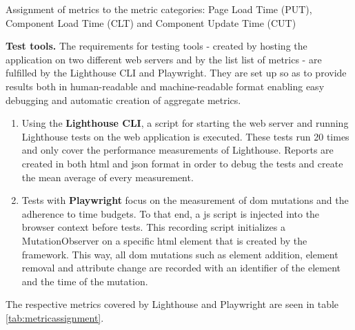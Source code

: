 \documentclass[a4paper, 12pt]{article}
\begin{document}
\begin{table}[h]
\begin{center}
  \end{center}
  \caption{Assignment of metrics to the metric categories: Page Load Time (PUT), Component Load Time (CLT) and Component Update Time (CUT)}
  \label{tab:metriccategories}
\end{table}

\textbf{Test tools.} The requirements for testing tools - created by hosting the application on two different web servers and by the list list of metrics - are fulfilled by the Lighthouse CLI and Playwright.
They are set up so as to provide results both in human-readable and machine-readable format enabling easy debugging and automatic creation of aggregate metrics.
\\

\begin{enumerate}
  \item Using the \textbf{Lighthouse CLI}, a script for starting the web server and running Lighthouse tests on the web application is executed.
  These tests run 20 times and only cover the performance measurements of Lighthouse.
  Reports are created in both \acrshort{html} and \acrshort{json} format in order to debug the tests and create the mean average of every measurement.
  \item Tests with \textbf{Playwright} focus on the measurement of \acrshort{dom} mutations and the adherence to time budgets.
  To that end, a \acrshort{js} script is injected into the browser context before tests.
  This recording script initializes a MutationObserver on a specific \acrshort{html} element that is created by the framework.
  This way, all \acrshort{dom} mutations such as element addition, element removal and attribute change are recorded with an identifier of the element and the time of the mutation.
\end{enumerate}

The respective metrics covered by Lighthouse and Playwright are seen in table \ref{tab:metricassignment}.
\end{document}
